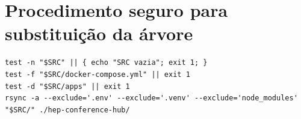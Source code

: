 \section{Procedimento seguro para substituição da árvore}

\begin{lstlisting}
test -n "$SRC" || { echo "SRC vazia"; exit 1; }
test -f "$SRC/docker-compose.yml" || exit 1
test -d "$SRC/apps" || exit 1
rsync -a --exclude='.env' --exclude='.venv' --exclude='node_modules' "$SRC/" ./hep-conference-hub/
\end{lstlisting}

